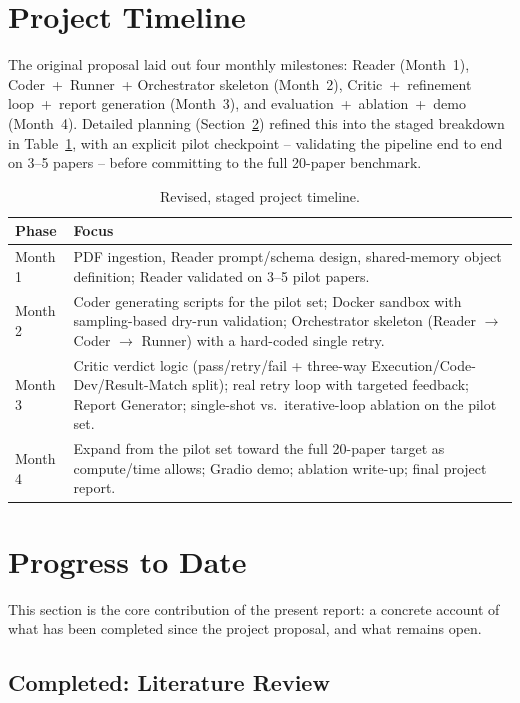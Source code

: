 \documentclass[11pt]{article}
\begin{document}
\section{Project Timeline}
\label{sec:timeline}

The original proposal laid out four monthly milestones: Reader (Month~1), Coder~+~Runner~+
Orchestrator skeleton (Month~2), Critic~+~refinement loop~+~report generation (Month~3),
and evaluation~+~ablation~+~demo (Month~4). Detailed planning (Section~\ref{sec:progress})
refined this into the staged breakdown in Table~\ref{tab:timeline}, with an explicit pilot
checkpoint -- validating the pipeline end to end on 3--5 papers -- before committing to
the full 20-paper benchmark.

\begin{table}[h]
\centering
\small
\begin{tabular}{@{}p{2.6cm}p{12.4cm}@{}}
\toprule
\textbf{Phase} & \textbf{Focus} \\
\midrule
Month 1 & PDF ingestion, Reader prompt/schema design, shared-memory object definition;
Reader validated on 3--5 pilot papers. \\
Month 2 & Coder generating scripts for the pilot set; Docker sandbox with sampling-based
dry-run validation; Orchestrator skeleton (Reader $\to$ Coder $\to$ Runner) with a
hard-coded single retry. \\
Month 3 & Critic verdict logic (pass/retry/fail + three-way Execution/Code-Dev/Result-Match
split); real retry loop with targeted feedback; Report Generator; single-shot vs.\
iterative-loop ablation on the pilot set. \\
Month 4 & Expand from the pilot set toward the full 20-paper target as compute/time
allows; Gradio demo; ablation write-up; final project report. \\
\bottomrule
\end{tabular}
\caption{Revised, staged project timeline.}
\label{tab:timeline}
\end{table}

\section{Progress to Date}
\label{sec:progress}

This section is the core contribution of the present report: a concrete account of what
has been completed since the project proposal, and what remains open.

\subsection{Completed: Literature Review}
\end{document}
